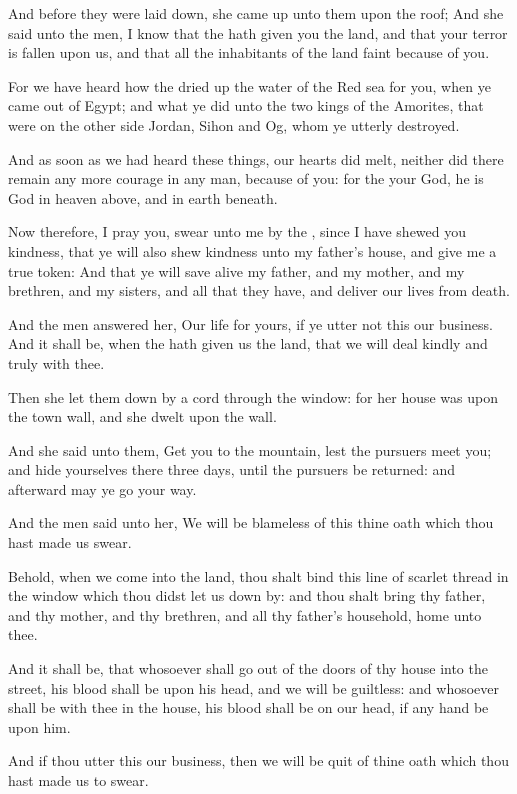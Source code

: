 \verse And before they were laid down, she came up unto them upon the roof; \verse And she said unto the men, I know that the \LORD hath given you the land, and that your terror is fallen upon us, and that all the inhabitants of the land faint because of you.

\verse For we have heard how the \LORD dried up the water of the Red sea for you, when ye came out of Egypt; and what ye did unto the two kings of the Amorites, that were on the other side Jordan, Sihon and Og, whom ye utterly destroyed.

\verse And as soon as we had heard these things, our hearts did melt, neither did there remain any more courage in any man, because of you: for the \LORD your God, he is God in heaven above, and in earth beneath.

\verse Now therefore, I pray you, swear unto me by the \LORD, since I have shewed you kindness, that ye will also shew kindness unto my father's house, and give me a true token: \verse And that ye will save alive my father, and my mother, and my brethren, and my sisters, and all that they have, and deliver our lives from death.

\verse And the men answered her, Our life for yours, if ye utter not this our business. And it shall be, when the \LORD hath given us the land, that we will deal kindly and truly with thee.

\verse Then she let them down by a cord through the window: for her house was upon the town wall, and she dwelt upon the wall.

\verse And she said unto them, Get you to the mountain, lest the pursuers meet you; and hide yourselves there three days, until the pursuers be returned: and afterward may ye go your way.

\verse And the men said unto her, We will be blameless of this thine oath which thou hast made us swear.

\verse Behold, when we come into the land, thou shalt bind this line of scarlet thread in the window which thou didst let us down by: and thou shalt bring thy father, and thy mother, and thy brethren, and all thy father's household, home unto thee.

\verse And it shall be, that whosoever shall go out of the doors of thy house into the street, his blood shall be upon his head, and we will be guiltless: and whosoever shall be with thee in the house, his blood shall be on our head, if any hand be upon him.

\verse And if thou utter this our business, then we will be quit of thine oath which thou hast made us to swear.

